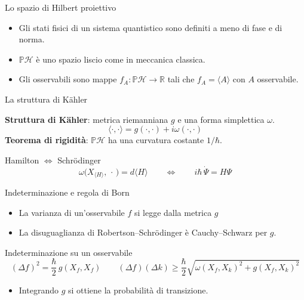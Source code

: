 \documentclass[aspectratio=169,11pt]{beamer}
\begin{document}
	
	\begin{frame}{Lo spazio di Hilbert proiettivo}
		\begin{itemize}
			\item Gli stati fisici di un sistema quantistico sono definiti a meno di fase e di norma.
			
			\item $\mathbb P\mathcal H$ è uno spazio liscio come in meccanica classica.
			
			\item Gli osservabili  sono mappe $f_A: \mathbb{P} \mathcal{H} \to \mathbb{R}$ tali che $f_A = \langle A \rangle$ con $A$ osservabile.
		\end{itemize}
	\end{frame}
	
	\begin{frame}{La struttura di Kähler}
		
		\textbf{Struttura di Kähler}: metrica riemanniana $g$ e una forma simplettica $\omega$. 
		$$
			\langle \cdot, \cdot \rangle = g(\cdot, \cdot) + i \omega(\cdot, \cdot)
		$$
		\textbf{Teorema di rigidità}: $\mathbb P\mathcal H$ ha una curvatura costante $1/\hbar$.

		\begin{block}{Hamilton $\iff$ Schr\"odinger}
			\centering
			\[
			\omega\big(X_{\langle H\rangle},\,\cdot\,\big) = d\langle H\rangle \qquad\Longleftrightarrow\qquad i\hbar\,\dot\Psi = H\Psi
			\]
		\end{block}
	\end{frame}
	

	
	\begin{frame}{Indeterminazione e regola di Born}
		\begin{itemize}
			\item La varianza di un'osservabile $f$ si legge dalla metrica $g$
			\item La disuguaglianza di Robertson--Schrödinger è Cauchy--Schwarz per $g$.
		\end{itemize}
		\begin{block}{Indeterminazione su un osservabile}
			\centering
			\[
			(\Delta f)^2 = \frac{\hbar}{2}\, g(X_f,X_f) \qquad (\Delta f)(\Delta k) \geq \frac{\hbar}{2} \sqrt{\omega(X_f, X_k)^2 + g(X_f,X_k)^2}
			\]
		\end{block}
	
		\begin{itemize}
			\item Integrando $g$ si ottiene la probabilità di transizione.
		\end{itemize}
	\end{frame}
	
\end{document}
